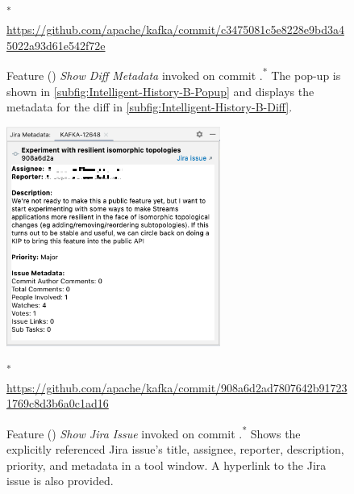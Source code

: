 \begin{figure}
    \centering%
    \qquad
    \caption{
        Feature () \textit{Show Diff Metadata} invoked on commit .\textsuperscript{*} The pop-up is shown in \autoref{subfig:Intelligent-History-B-Popup} and displays the metadata for the diff in \autoref{subfig:Intelligent-History-B-Diff}.
    }%
    \scriptsize\textsuperscript{*} \url{https://github.com/apache/kafka/commit/c3475081c5e8228e9bd3a45022a93d61e542f72e}
    \label{fig:Intelligent-History-B}%
\end{figure}

\begin{figure}
    \center
    \includegraphics[width=7cm]{./images/intelligent-history-C.png}
    \caption{
        Feature () \textit{Show Jira Issue} invoked on commit .\textsuperscript{*}
        Shows the explicitly referenced Jira issue's title, assignee, reporter, description, priority, and metadata in a tool window. A hyperlink to the Jira issue is also provided.
    }
    \scriptsize\textsuperscript{*} \url{https://github.com/apache/kafka/commit/908a6d2ad7807642b917231769c8d3b6a0c1ad16}
    \label{fig:Intelligent-History-C}
\end{figure}


